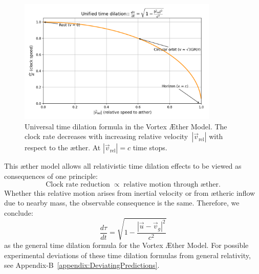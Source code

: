 \begin{figure}[htbp]
    \centering
    \includegraphics[width=0.85\textwidth]{images/11-TijdsvertragingRelatieveBeweging}
    \caption{Universal time dilation formula in the Vortex Æther Model. The clock rate decreases with increasing relative velocity~$|\vec{v}_{\mathrm{rel}}|$ with respect to the æther. At $|\vec{v}_{\mathrm{rel}}| = c$ time stops.}
    \label{fig:TijdsvertragingRelatieveBeweging}
\end{figure}

This æther model allows all relativistic time dilation effects to be viewed as consequences of one principle:
\[
\text{Clock rate reduction} \;\propto\; \text{relative motion through æther}.
\]
Whether this relative motion arises from inertial velocity or from ætheric inflow due to nearby mass, the observable consequence is the same. Therefore, we conclude:
\[
\boxed{\frac{d\tau}{dt} = \sqrt{1 - \frac{|\vec{u} - \vec{v}_g|^2}{c^2}}}
\]
as the general time dilation formula for the Vortex Æther Model.
For possible experimental deviations of these time dilation formulas from general relativity, see Appendix-B~\ref{appendix:DeviatingPredictions}.